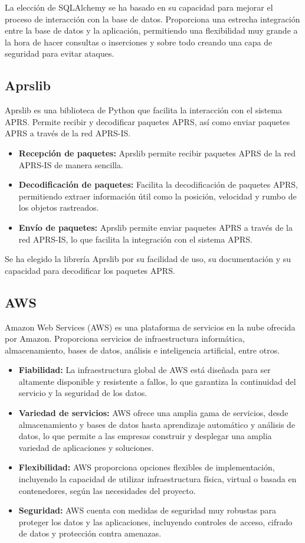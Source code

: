 \noindent La elección de SQLAlchemy se ha basado en su capacidad para mejorar el proceso de interacción con la base de datos. Proporciona una estrecha integración entre la base de datos y la aplicación, permitiendo una flexibilidad muy grande a la hora de hacer consultas o inserciones y sobre todo creando una capa de seguridad para evitar ataques.

\subsection{Aprslib}
Aprslib es una biblioteca de Python que facilita la interacción con el sistema APRS. Permite recibir y decodificar paquetes APRS, así como enviar paquetes APRS a través de la red APRS-IS.
\begin{itemize}
	\item \textbf{Recepción de paquetes:} Aprslib permite recibir paquetes APRS de la red APRS-IS de manera sencilla.
	\item \textbf{Decodificación de paquetes:} Facilita la decodificación de paquetes APRS, permitiendo extraer información útil como la posición, velocidad y rumbo de los objetos rastreados.
	\item \textbf{Envío de paquetes:} Aprslib permite enviar paquetes APRS a través de la red APRS-IS, lo que facilita la integración con el sistema APRS.
\end{itemize}
\noindent Se ha elegido la librería Aprslib por su facilidad de uso, su documentación y su capacidad para decodificar los paquetes APRS.

\subsection{AWS}
Amazon Web Services (AWS) es una plataforma de servicios en la nube ofrecida por Amazon. Proporciona servicios de infraestructura informática, almacenamiento, bases de datos, análisis e inteligencia artificial, entre otros.

\begin{itemize}
	\item \textbf{Fiabilidad:} La infraestructura global de AWS está diseñada para ser altamente disponible y resistente a fallos, lo que garantiza la continuidad del servicio y la seguridad de los datos.
	\item \textbf{Variedad de servicios:} AWS ofrece una amplia gama de servicios, desde almacenamiento y bases de datos hasta aprendizaje automático y análisis de datos, lo que permite a las empresas construir y desplegar una amplia variedad de aplicaciones y soluciones.
	\item \textbf{Flexibilidad:} AWS proporciona opciones flexibles de implementación, incluyendo la capacidad de utilizar infraestructura física, virtual o basada en contenedores, según las necesidades del proyecto.
	\item \textbf{Seguridad:} AWS cuenta con medidas de seguridad muy robustas para proteger los datos y las aplicaciones, incluyendo controles de acceso, cifrado de datos y protección contra amenazas.
\end{itemize}

